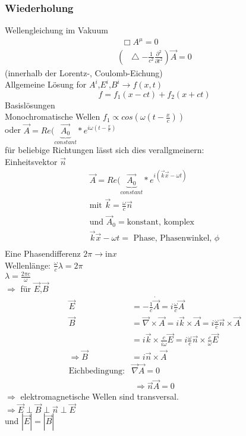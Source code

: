 \documentclass[a4paper]{article}
\newcommand*\laplace{\mathop{}\!\mathbin\bigtriangleup}
\newcommand*\dalembert{\mathop{}\!\mathbin\Box}
\begin{document}
\subsubsection{Wiederholung}
Wellengleichung im Vakuum 
\begin{align}
\dalembert A^\mu=0\\
\left( \laplace - \frac{1}{c^2} \frac{\partial^2}{\partial t^2} \right)\vec{A}=0
\end{align}
(innerhalb der Lorentz-, Coulomb-Eichung)\\
Allgemeine Lösung for $A^i$,$E^i$,$B^i\rightarrow f(x,t)$
\begin{equation}
f=f_1(x-ct)+f_2(x+ct)
\end{equation}
Basislösungen\\
Monochromatische Wellen $f_1\propto cos(\omega \left( t-\frac{x}{c}
\right))$\\
oder $\vec{A}=Re(\underbrace{\vec{A_0}}_{constant} *
e^{i\omega(t-\frac{x}{c})}$\\ 
für beliebige Richtungen lässt sich dies verallgmeinern:\\
Einheitsvektor $\vec{n}$ 
\begin{align}
\vec{A}=Re(\underbrace{\vec{A_0}}_{constant} * e^{i(\vec{k}\vec{x}-\omega t)}\\
\text{mit }\vec{k}=\frac{\omega}{c}\vec{n}\\
\text{und }\vec{A}_0= \text{konstant, komplex}\\
\vec{k}\vec{x}-\omega t =\text{ Phase, Phasenwinkel, }\phi\\
\end{align}
Eine Phasendifferenz $2\pi \rightarrow \text{in} x$\\
Wellenlänge: $\frac{\omega}{c}\lambda=2\pi$\\
$\lambda=\frac{2\pi c}{\omega}$\\
$\Rightarrow$ für $\vec{E}$,$\vec{B}$
\begin{align}
\vec{E}&=-\frac{1}{c}\dot{\vec{A}}=i\frac{\omega}{c}\vec{A}\\
\vec{B}&=\vec{\nabla}\times\vec{A}=i\vec{k}\times\vec{A}=i\frac{\omega}{c}\vec{n}\times\vec{A}\\
&=i\vec{k}\times\frac{c}{i\omega}\vec{E}=i\frac{\omega}{c}\vec{n}\times\frac{c}{\omega}\vec{E}\\
\Rightarrow \vec{B}&=i\vec{n}\times\vec{A}\\
\text{Eichbedingung}: & \vec{\nabla}\vec{A}=0
\end{align}
\begin{align}
\Rightarrow \vec{n}\vec{A}=0
\end{align}
$\Rightarrow$ elektromagnetische Wellen sind transversal.\\
$\Rightarrow \vec{E}\perp\vec{B}\perp\vec{n}\perp\vec{E}$\\
und $|\vec{E}|=|\vec{B}|$\\
\end{document}

